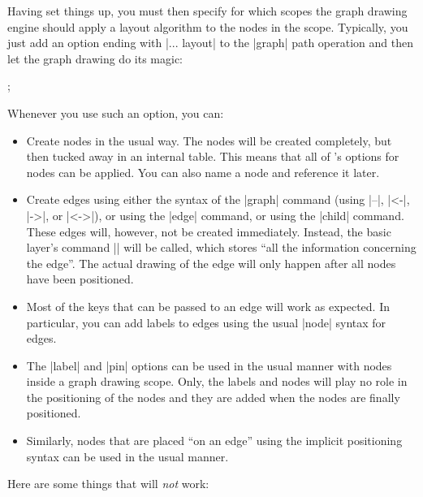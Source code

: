 Having set things up, you must then specify for which scopes the graph drawing
engine should apply a layout algorithm to the nodes in the scope. Typically,
you just add an option ending with |... layout| to the |graph| path operation
and then let the graph drawing do its magic:
%
\begin{codeexample}[preamble={\usetikzlibrary{graphs,graphdrawing}
\usegdlibrary{layered}}]
  ;
\end{codeexample}

Whenever you use such an option, you can:
%
\begin{itemize}
    \item Create nodes in the usual way. The nodes will be created completely,
        but then tucked away in an internal table. This means that all of
        \tikzname's options for nodes can be applied. You can also name a node
        and reference it later.
    \item Create edges using either the syntax of the |graph| command (using
        |--|, |<-|, |->|, or |<->|), or using the |edge| command, or using the
        |child| command. These edges will, however, not be created immediately.
        Instead, the basic layer's command |\pgfgdedge| will be called, which
        stores ``all the information concerning the edge''. The actual drawing
        of the edge will only happen after all nodes have been positioned.
    \item Most of the keys that can be passed to an edge will work as expected.
        In particular, you can add labels to edges using the usual |node|
        syntax for edges.
    \item The |label| and |pin| options can be used in the usual manner with
        nodes inside a graph drawing scope. Only, the labels and nodes will
        play no role in the positioning of the nodes and they are added when
        the nodes are finally positioned.
    \item Similarly, nodes that are placed ``on an edge'' using the implicit
        positioning syntax can be used in the usual manner.
\end{itemize}
%
Here are some things that will \emph{not} work:
%
